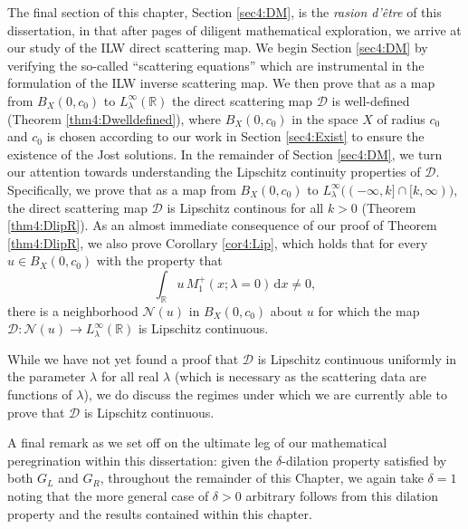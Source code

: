 \documentclass[../dissertation.tex]{subfiles}
\begin{document}
The final section of this chapter, Section \ref{sec4:DM}, is the 
\textit{rasion d'\^etre} of this dissertation, in that after 
\pageref{lastpagePenultimateSection} pages of diligent mathematical exploration, 
we arrive at our study of the ILW direct scattering map. We begin Section 
\ref{sec4:DM} by verifying the so-called ``scattering equations'' which are
instrumental in the formulation of the ILW inverse scattering map. We then prove 
that as a map from $B_X(0, c_0)$ to $L_\lambda^\infty(\mathbb R)$ the direct 
scattering map $\mathscr D$ is well-defined (Theorem \ref{thm4:Dwelldefined}), 
where  $B_X(0, c_0)$ in the space $X$ of radius $c_0$ and $c_0$ is chosen 
according to our work in Section \ref{sec4:Exist} to ensure the existence of the
Jost solutions. In the remainder of Section \ref{sec4:DM}, we turn our attention
towards understanding the Lipschitz continuity properties of $\mathscr D$. Specifically,
we prove that as a map from $B_X(0, c_0)$ to 
$L_\lambda^\infty\big((-\infty,k]\cap[k, \infty) \big)$, the direct scattering map 
$\mathscr D$ is Lipschitz continous for all $k>0$ (Theorem \ref{thm4:DlipR}). As
an almost immediate consequence of our proof of Theorem \ref{thm4:DlipR}, we 
also prove Corollary \ref{cor4:Lip}, which holds that for every 
$u \in B_X(0,c_0)$ with the property that 
\[
	\int_{\mathbb R} u \, M_1^+(x; \lambda = 0) \, \mathrm{d}x \ne 0,
\]
there is a neighborhood $\mathcal N(u)$ in $B_X(0, c_0)$ about $u$ for which 
the map $\mathscr D: \mathcal N(u) \to L^\infty_\lambda(\mathbb R)$ is 
Lipschitz continuous. 




While we have not yet found a proof that $\mathscr D$ is Lipschitz continuous 
uniformly in the parameter $\lambda$ for all real $\lambda$ (which is necessary 
as the scattering data are functions of $\lambda$), we do discuss the regimes 
under which we are currently able to prove that $\mathscr D$ is Lipschitz 
continuous. 

A final remark as we set off on the ultimate leg of our mathematical 
peregrination within this dissertation: 
given the $\delta$-dilation property satisfied by both $G_L$ and $G_R$, throughout 
the remainder of this Chapter, we again take $\delta = 1$ noting that the more general 
case of $\delta>0$ arbitrary follows from this dilation property and the results
contained within this chapter. 
\end{document}
